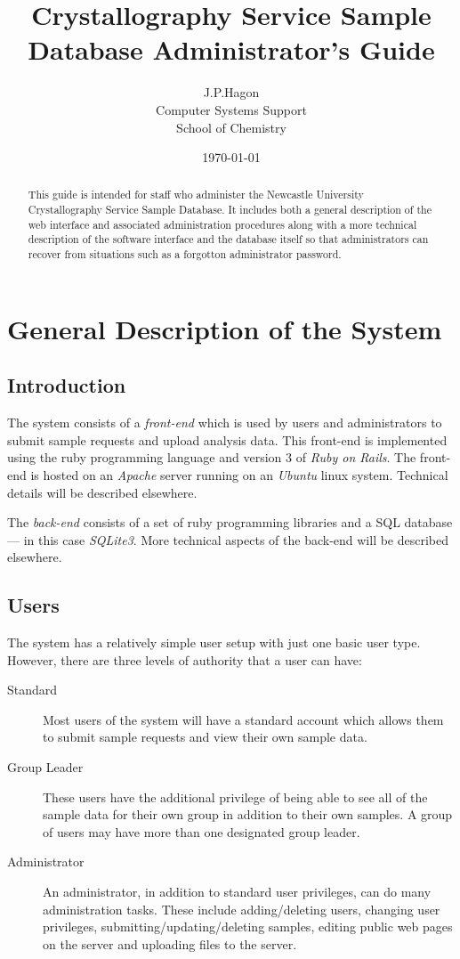 \documentclass[12pt,twoside]{article}
\title{\sffamily\bfseries Crystallography Service Sample Database Administrator's Guide}
\author{J.P.Hagon\\Computer Systems Support\\School of Chemistry}
\date{\today}
\begin{document}
\maketitle
\begin{abstract}
This guide is intended for staff who administer the Newcastle University
Crystallography Service Sample Database.
It includes both a general description of the web interface and 
associated administration procedures along with a more technical
description of the software interface and the database itself so that
administrators can recover from situations such as a forgotton
administrator password.
\end{abstract}
\tableofcontents
\newpage
\section{General Description of the System}
\subsection{Introduction}
The system consists of a \emph{front-end} which is used by users
and administrators to submit sample requests and upload analysis data. 
This front-end is implemented using the 
ruby\cite{ruby} programming language and 
version 3 of \emph{Ruby on Rails}\cite{rails}.
The front-end is hosted on an \emph{Apache}\cite{apache} server running on an
\emph{Ubuntu}\cite{ubuntu} linux system. 
Technical details will be described elsewhere.

The \emph{back-end} consists of a set of ruby programming libraries
and a SQL database --- in this case 
\emph{SQLite3}\cite{sqlite}.
More technical aspects of the back-end will be described elsewhere.

\subsection{Users}

The system has a relatively simple user setup with just one basic user
type. However, there are three levels of authority that a user can have:
\begin{description}
\item[Standard]
Most users of the system will have a standard account which allows them
to submit sample requests and view their own sample data.
\item[Group Leader]
These users have the additional privilege of being able to see all
of the sample data for their own group in addition to their own
samples. A group of users may have more than one designated group leader.
\item[Administrator]
An administrator, in addition to standard user privileges, can do many
administration tasks. These include adding/deleting users, changing user
privileges, submitting/updating/deleting samples, editing public web
pages on the server and uploading files to the server.
\end{description}
\end{document}
